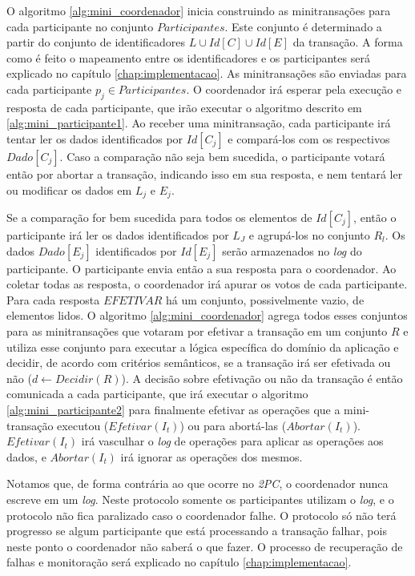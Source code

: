 \documentclass[11pt,twoside,a4paper]{book}
\begin{document}
O algoritmo \ref{alg:mini_coordenador} inicia construindo as minitransações para cada participante no conjunto $Participantes$. Este conjunto é determinado a partir do conjunto de identificadores $L \cup Id[C] \cup Id[E]$ da transação. A forma como é feito o mapeamento entre os identificadores e os participantes será explicado no capítulo \ref{chap:implementacao}. As minitransações são enviadas para cada participante $p_j \in Participantes$. O coordenador irá esperar pela execução e resposta de cada participante, que irão executar o algoritmo descrito em \ref{alg:mini_participante1}. Ao receber uma minitransação, cada participante irá tentar ler os dados identificados por $Id[C_j]$ e compará-los com os respectivos $Dado[C_j]$. Caso a comparação não seja bem sucedida, o participante votará então por abortar a transação, indicando isso em sua resposta, e nem tentará ler ou modificar os dados em $L_j$ e $E_j$.

Se a comparação for bem sucedida para todos os elementos de $Id[C_j]$, então o participante irá ler os dados identificados por $L_J$ e agrupá-los no conjunto $R_l$. Os dados $Dado[E_j]$ identificados por $Id[E_j]$ serão armazenados no \emph{log} do participante. O participante envia então a sua resposta para o coordenador. Ao coletar todas as resposta, o coordenador irá apurar os votos de cada participante. Para cada resposta $EFETIVAR$ há um conjunto, possivelmente vazio, de elementos lidos. O algoritmo \ref{alg:mini_coordenador} agrega todos esses conjuntos para as minitransações que votaram por efetivar a transação em um conjunto $R$ e utiliza esse conjunto para executar a lógica específica do domínio da aplicação e decidir, de acordo com critérios semânticos, se a transação irá ser efetivada ou não ($d \gets Decidir(R)$). A decisão sobre efetivação ou não da transação é então comunicada a cada participante, que irá executar o algoritmo \ref{alg:mini_participante2} para finalmente efetivar as operações que a mini-transação executou ($Efetivar(I_t)$) ou para abortá-las ($Abortar(I_t)$). $Efetivar(I_t)$ irá vasculhar o \emph{log} de operações para aplicar as operações aos dados, e $Abortar(I_t)$ irá ignorar as operações dos mesmos.

Notamos que, de forma contrária ao que ocorre no \emph{2PC}, o coordenador nunca escreve em um \emph{log}. Neste protocolo somente os participantes utilizam o \emph{log}, e o protocolo não fica paralizado caso o coordenador falhe. O protocolo só não terá progresso se algum participante que está processando a transação falhar, pois neste ponto o coordenador não saberá o que fazer. O processo de recuperação de falhas e monitoração será explicado no capítulo \ref{chap:implementacao}.
\end{document}
